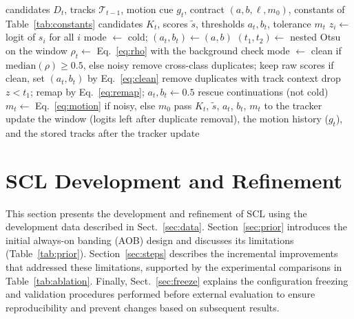\documentclass[pdflatex,sn-mathphys-num,iicol]{sn-jnl}
\newcommand{\scl}{SCL}
\newcommand{\aob}{AOB}
\begin{document}
\begin{algorithm}[t]
\caption{\scl{} for frame $t$; the comments name the steps of Fig.~\ref{fig:arch}. The window
holds the logits of frames $t-W$ to $t-1$, so the decision for frame $t$ uses no future frame.}\label{alg:layer}
\begin{algorithmic}[1]
\Require candidates $D_t$, tracks $\mathcal{T}_{t-1}$, motion cue $g_t$, contract $(a,b,\ell,m_0)$, constants of Table~\ref{tab:constants}
\Ensure candidates $K_t$, scores $\tilde{s}$, thresholds $a_t,b_t$, tolerance $m_t$
\State $z_i\gets$ logit of $s_i$ for all $i$ 
 
  \State mode $\gets$ cold; $(a_t,b_t)\gets(a,b)$
\Else
  \State $(t_1,t_2)\gets$ nested Otsu on the window 
  \State $\rho_t\gets$ Eq.~\eqref{eq:rho} with the background check
  \State mode $\gets$ clean if $\mathrm{median}(\rho)\ge0.5$, else noisy 
\EndIf
{} 
  \State remove cross-class duplicates; keep raw scores
  \State if clean, set $(a_t,b_t)$ by Eq.~\eqref{eq:clean}
\Else {}
  \State remove duplicates with track context
  \State drop $z<t_1$; remap by Eq.~\eqref{eq:remap}; $a_t,b_t\gets0.5$
\EndIf
\State rescue continuations (not cold) 
\State $m_t\gets$ Eq.~\eqref{eq:motion} if noisy, else $m_0$ 
\State pass $K_t$, $\tilde{s}$, $a_t$, $b_t$, $m_t$ to the tracker
\State update the window (logits left after duplicate removal), the motion history ($g_t$), and the stored tracks after the tracker update
\end{algorithmic}
\end{algorithm}
\section{SCL Development and Refinement}\label{sec:development}

This section presents the development and refinement of \scl{} using the development data
described in Sect.~\ref{sec:data}. Section~\ref{sec:prior} introduces the initial always-on banding
(\aob{}) design and discusses its limitations (Table~\ref{tab:prior}). Section~\ref{sec:steps}
describes the incremental improvements that addressed these limitations, supported by the
experimental comparisons in Table~\ref{tab:ablation}. Finally, Sect.~\ref{sec:freeze} explains the
configuration freezing and validation procedures performed before external evaluation to ensure
reproducibility and prevent changes based on subsequent results.
\end{document}
